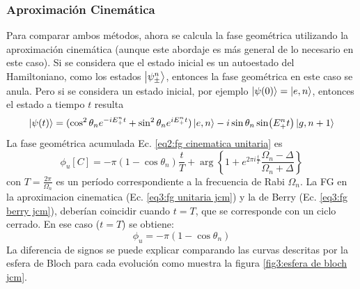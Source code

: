 \subsubsection{Aproximación Cinemática}
Para comparar ambos métodos, ahora se calcula la fase geométrica utilizando la aproximación cinemática (aunque este abordaje es más general de lo necesario en este caso).
Si se considera que el estado inicial es un autoestado del Hamiltoniano, como los estados $\ket{\psi_\pm^n}$, entonces la fase geométrica en este caso se anula. Pero si se considera un estado inicial, por ejemplo $\ket{\psi(0)}=\ket{e,n}$, entonces el estado a tiempo $t$ resulta
\begin{equation}\label{eq3:fg berry jcm}
    \ket{\psi(t)}=(\cos^2\theta_ne^{-iE_+^nt}+\sin^2\theta_ne^{iE_+^nt})\ket{e,n}-i \sin\theta_n\sin(E_+^nt)\ket{g,n+1}
\end{equation}
La fase geométrica acumulada Ec. \ref{eq2:fg cinematica unitaria} es
\begin{equation}\label{eq3:fg unitaria jcm}
    \phi_u[C]=-\pi(1-\cos\theta_n)\frac{t}{T} +\arg\left\{ 1+e^{2\pi i \frac{t}{T}}\frac{\Omega_n-\Delta}{\Omega_n+\Delta} \right\}
\end{equation}
con $T=\frac{2\pi}{\Omega_n}$ es un período correspondiente a la frecuencia de Rabi $\Omega_n$. La FG en la aproximacion cinematica (Ec. \ref{eq3:fg unitaria jcm}) y la de Berry (Ec. \ref{eq3:fg berry jcm}), deberían coincidir cuando $t=T$, que se corresponde con un ciclo cerrado. En ese caso ($t=T$) se obtiene:
\begin{equation}
    \phi_u=-\pi(1-\cos\theta_n)
\end{equation}
La diferencia de signos se puede explicar comparando las curvas descritas por la esfera de Bloch para cada evolución como muestra la figura \ref{fig3:esfera de bloch jcm}. 
